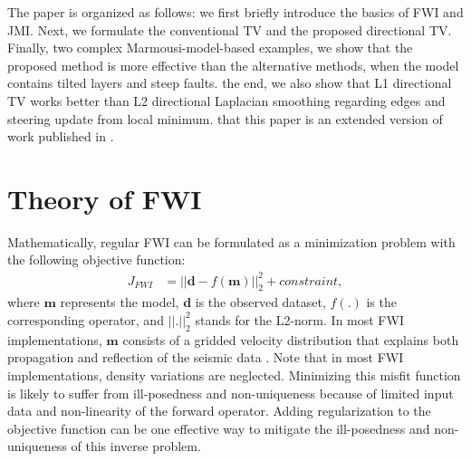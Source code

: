The paper is organized as follows: we first briefly introduce the basics of FWI and JMI. Next, we formulate the conventional TV and the proposed directional TV. Finally,  two complex Marmousi-model-based examples, we show that the proposed method is more effective than the alternative methods, when the model contains tilted layers and steep faults.  the end, we also show that L1 directional TV works better than L2 directional Laplacian smoothing regarding  edges and  steering  update  from local minimum.  that this paper is an extended version of work published in \cite{qu2017full}.

\section{Theory of FWI}
Mathematically, regular FWI can be formulated as a minimization problem with the following objective function:
\begin{equation}
\begin{split}
      J_{FWI} &=|| \mathbf{d} - f\left(\mathbf{m}\right) ||_2^2 + constraint,
\label{eq1:FWI}
\end{split}
\end{equation}
where $\mathbf{m}$ represents the model, $\mathbf{d}$ is the observed dataset, $f\left(.\right)$ is the corresponding  operator, and $||.||_2^2$ stands for the L2-norm. In most FWI implementations, $\mathbf{m}$ consists of a gridded velocity distribution that explains both propagation and reflection of the seismic data \citep{Virieux09}. Note that in most FWI implementations, density variations are neglected. Minimizing this misfit function is likely to suffer from ill-posedness and non-uniqueness because of limited input data and non-linearity of the forward  operator. Adding regularization to the objective function can be one effective way to mitigate the ill-posedness and non-uniqueness of this inverse problem.

